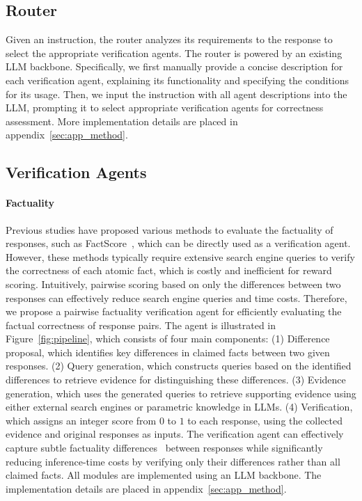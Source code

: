 \subsection{Router}
\label{sec:router}
Given an instruction, the router analyzes its requirements to the response to select the appropriate verification agents. 
The router is powered by an existing LLM backbone. Specifically, we first manually provide a concise description for each verification agent, 
explaining its functionality and specifying the conditions for its usage. Then, we input the instruction with all agent descriptions into the LLM, prompting it to select appropriate verification agents for correctness assessment. More implementation details are placed in appendix~\ref{sec:app_method}.


\subsection{Verification Agents}
\label{sec:scoring_agents}
\paragraph{Factuality}
Previous studies have proposed various methods to evaluate the factuality of responses, such as FactScore~\citep{min2023factscore}, which can be directly used as a verification agent. However, these methods typically require extensive search engine queries to verify the correctness of each atomic fact, which is costly and inefficient for reward scoring. Intuitively, pairwise scoring based on only the differences between two responses can effectively reduce search engine queries and time costs. Therefore, we propose a pairwise factuality verification agent for efficiently evaluating the factual correctness of response pairs.
The agent is illustrated in Figure~\ref{fig:pipeline}, which consists of four main components:
(1) Difference proposal, which identifies key differences in claimed facts between two given responses.
(2) Query generation, which constructs queries based on the identified differences to retrieve evidence for distinguishing these differences.
(3) Evidence generation, which uses the generated queries to retrieve supporting evidence using either external search engines or parametric knowledge in LLMs.
(4) Verification, which assigns an integer score from $0$ to $1$ to each response, using the collected evidence and original responses as inputs.
The verification agent can effectively capture subtle factuality differences~\citep{jiang2023llm} between responses while significantly reducing inference-time costs by verifying only their differences rather than all claimed facts.
All modules are implemented using an LLM backbone. The implementation details are placed in appendix~\ref{sec:app_method}.



